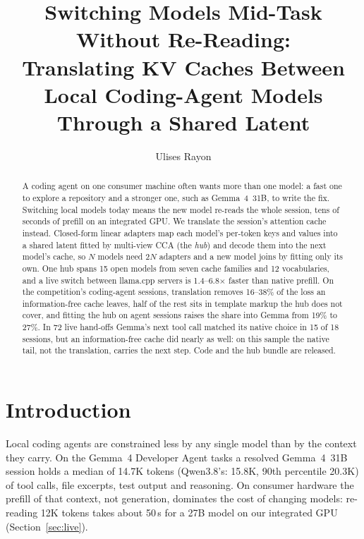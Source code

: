 \documentclass[11pt]{article}
\title{Switching Models Mid-Task Without Re-Reading:\\
Translating KV Caches Between Local Coding-Agent Models Through a Shared Latent}
\author{Ulises Rayon}
\date{}
\begin{document}
\maketitle

\begin{abstract}
A coding agent on one consumer machine often wants more than one model: a fast one to explore a
repository and a stronger one, such as Gemma~4~31B, to write the fix. Switching local models today
means the new model re-reads the whole session, tens of seconds of prefill on an integrated GPU. We
translate the session's attention cache instead. Closed-form linear adapters map each model's per-token
keys and values into a shared latent fitted by multi-view CCA (the \emph{hub}) and decode them into the
next model's cache, so $N$ models need $2N$ adapters and a new model joins by fitting only its own. One
hub spans 15 open models from seven cache families and 12 vocabularies, and a live switch between
llama.cpp servers is 1.4--6.8$\times$ faster than native prefill. On the competition's coding-agent
sessions, translation removes 16--38\% of the loss an information-free cache leaves, half of the rest
sits in template markup the hub does not cover, and fitting the hub on agent sessions raises the share into
Gemma from 19\% to 27\%. In 72 live hand-offs Gemma's
next tool call matched its native choice in 15 of 18 sessions, but an information-free cache did nearly
as well: on this sample the native tail, not the translation, carries the next step. Code and the hub
bundle are released.
\end{abstract}

\section{Introduction}

Local coding agents are constrained less by any single model than by the context they carry. On the
Gemma~4 Developer Agent tasks a resolved Gemma~4~31B session holds a median of 14.7K tokens (Qwen3.8's:
15.8K, 90th percentile 20.3K) of tool calls, file excerpts, test output and reasoning. On consumer
hardware the prefill of that context, not generation, dominates the cost of changing models: re-reading
12K tokens takes about 50\,s for a 27B model on our integrated GPU (Section~\ref{sec:live}).
\end{document}
